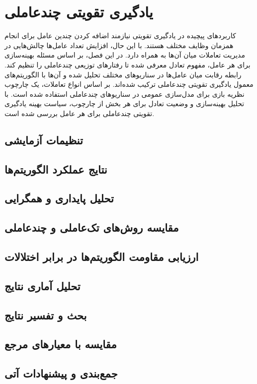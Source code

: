 \chapter{یادگیری تقویتی چندعاملی}
کاربردهای پیچیده در یادگیری تقویتی نیازمند اضافه کردن چندین عامل برای انجام همزمان وظایف مختلف هستند.
با این حال، افزایش تعداد عامل‌ها چالش‌هایی در مدیریت تعاملات میان آن‌ها به همراه دارد.
در این فصل، بر اساس مسئله بهینه‌سازی برای هر عامل، مفهوم تعادل معرفی شده تا رفتارهای توزیعی چندعاملی را تنظیم کند.
رابطه رقابت میان عامل‌ها در سناریوهای مختلف تحلیل شده و آن‌ها با الگوریتم‌های معمول یادگیری تقویتی چندعاملی ترکیب شده‌اند. بر اساس انواع تعاملات، یک چارچوب نظریه بازی برای مدل‌سازی عمومی در سناریوهای چندعاملی استفاده شده است. با تحلیل بهینه‌سازی و وضعیت تعادل برای هر بخش از چارچوب، سیاست بهینه یادگیری تقویتی چندعاملی برای هر عامل بررسی شده است.




  
    
    
    
    
    
    
     
%    
%    
       \section{تنظیمات آزمایشی}
    \section{نتایج عملکرد الگوریتم‌ها}
    \section{تحلیل پایداری و همگرایی}
    \section{مقایسه روش‌های تک‌عاملی و چندعاملی}
    \section{ارزیابی مقاومت الگوریتم‌ها در برابر اختلالات}
    \section{تحلیل آماری نتایج}
    \section{بحث و تفسیر نتایج}
    \section{مقایسه با معیارهای مرجع}
    \section{جمع‌بندی و پیشنهادات آتی} 